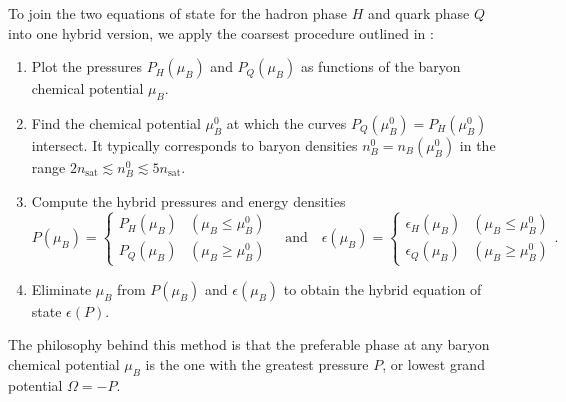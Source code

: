To join the two equations of state for the hadron phase $H$ and quark phase $Q$ into one hybrid version,
we apply the coarsest procedure outlined in \cite[section V-C]{ref:quark_star_review}:
\begin{enumerate}
\item \label{step:hybrid:one}%
      Plot the pressures $P_H(\mu_B)$ and $P_Q(\mu_B)$ as functions of the baryon chemical potential $\mu_B$.
\item \label{step:hybrid:two}%
      Find the chemical potential $\mu_B^0$ at which the curves $P_Q(\mu_B^0) = P_H(\mu_B^0)$ intersect.
      It typically corresponds to baryon densities $n_B^0 = n_B(\mu_B^0)$ in the range $2 n_\text{sat} \lesssim n_B^0 \lesssim 5 n_\text{sat}$.
\item \label{step:hybrid:three}%
      Compute the hybrid pressures and energy densities
      \begin{equation}
          P(\mu_B) = \begin{cases} P_H(\mu_B) & (\mu_B \leq \mu_B^0) \\ P_Q(\mu_B) & (\mu_B \geq \mu_B^0)  \end{cases}
          \quad \text{and} \quad
          \epsilon(\mu_B) = \begin{cases} \epsilon_H(\mu_B) & (\mu_B \leq \mu_B^0) \\ \epsilon_Q(\mu_B) & (\mu_B \geq \mu_B^0) \end{cases}.
      \label{eq:hybrid:pressure_energy_density}
      \end{equation}
\item \label{step:hybrid:four}%
      Eliminate $\mu_B$ from $P(\mu_B)$ and $\epsilon(\mu_B)$ to obtain the hybrid equation of state $\epsilon(P)$.
\end{enumerate}
The philosophy behind this method is that the preferable phase at any baryon chemical potential $\mu_B$ is the one with the greatest pressure $P$, or lowest grand potential $\Omega = -P$.

